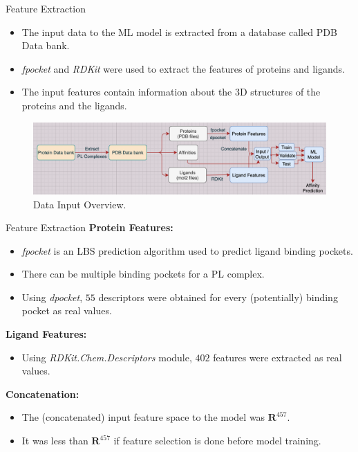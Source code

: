 \documentclass{beamer}
\begin{document}
\begin{frame}[t]{Feature Extraction}

\begin{itemize}
\item The input data to the ML model is extracted from a database called PDB Data bank.
\item \textit{fpocket} and \textit{RDKit} were used to extract the features of proteins and ligands.
\item The input features contain information about the 3D structures of the proteins and the ligands.
\end{itemize}

\begin{figure}[htb]
  \centering
    \includegraphics[scale=0.36]{images/DataInputOverview}
    \caption{Data Input Overview.}
    \label{fig:projectoverviewimage}
\end{figure}


\end{frame}

\begin{frame}[t]{Feature Extraction}
\textbf{Protein Features:}
\begin{itemize}
\item \textit{fpocket} is an LBS prediction algorithm used to predict ligand binding pockets.
\item There can be multiple binding pockets for a PL complex.
\item Using \textit{dpocket},  $55$ descriptors were obtained for every (potentially) binding pocket as real values.
\end{itemize}

\textbf{Ligand Features:}
\begin{itemize}
\item Using \textit{RDKit.Chem.Descriptors} module,  $402$ features were extracted as real values.
\end{itemize}

\textbf{Concatenation:}
\begin{itemize}
\item The (concatenated) input feature space to the model was $\mathbf{R}^{457}$.
\item It was less than $\mathbf{R}^{457}$ if feature selection is done before model training.
\end{itemize}

\end{frame}
\end{document}
